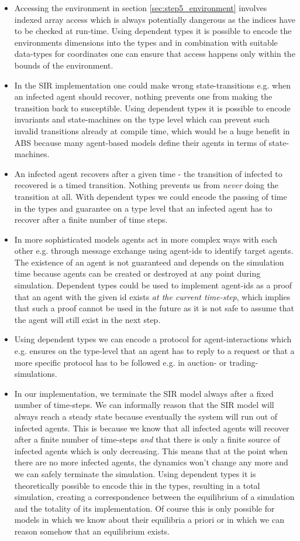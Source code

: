 \begin{itemize}
	\item Accessing the environment in section \ref{sec:step5_environment} involves indexed array access which is always potentially dangerous as the indices have to be checked at run-time. Using dependent types it is possible to encode the environments dimensions into the types and in combination with suitable data-types for coordinates one can ensure that access happens only within the bounds of the environment.
	\item In the SIR implementation one could make wrong state-transitions e.g. when an infected agent should recover, nothing prevents one from making the transition back to susceptible. Using dependent types it is possible to encode invariants and state-machines on the type level which can prevent such invalid transitions already at compile time, which would be a huge benefit in ABS because many agent-based models define their agents in terms of state-machines.
	\item An infected agent recovers after a given time - the transition of infected to recovered is a timed transition. Nothing prevents us from \textit{never} doing the transition at all. With dependent types we could encode the passing of time in the types and guarantee on a type level that an infected agent has to recover after a finite number of time steps.
	\item In more sophisticated models agents act in more complex ways with each other e.g. through message exchange using agent-ids to identify target agents. The existence of an agent is not guaranteed and depends on the simulation time because agents can be created or destroyed at any point during simulation. Dependent types could be used to implement agent-ids as a proof that an agent with the given id exists \textit{at the current time-step}, which implies that such a proof cannot be used in the future as it is not safe to assume that the agent will still exist in the next step.
	\item Using dependent types we can encode a protocol for agent-interactions which e.g. ensures on the type-level that an agent has to reply to a request or that a more specific protocol has to be followed e.g. in auction- or trading-simulations.
	\item In our implementation, we terminate the SIR model always after a fixed number of time-steps. We can informally reason that the SIR model will always reach a steady state because eventually the system will run out of infected agents. This is because we know that all infected agents will recover after a finite number of time-steps \textit{and} that there is only a finite source of infected agents which is only decreasing. This means that at the point when there are no more infected agents, the dynamics won't change any more and we can safely terminate the simulation. Using dependent types it is theoretically possible to encode this in the types, resulting in a total simulation, creating a correspondence between the equilibrium of a simulation and the totality of its implementation. Of course this is only possible for models in which we know about their equilibria a priori or in which we can reason somehow that an equilibrium exists.
\end{itemize}